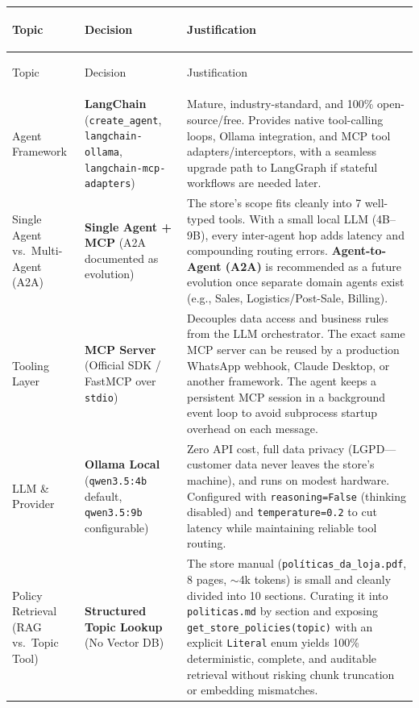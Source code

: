 \documentclass[11pt,a4paper]{article}
\begin{document}
\begingroup
\footnotesize
\setlength{\tabcolsep}{4pt}
\begin{longtable}{>{\bfseries\raggedright\arraybackslash}p{2.9cm} >{\raggedright\arraybackslash}p{3.6cm} >{\raggedright\arraybackslash}p{9.1cm}}
\toprule
Topic & Decision & Justification \\
\midrule
\endfirsthead
\toprule
Topic & Decision & Justification \\
\midrule
\endhead
Agent Framework & \textbf{LangChain} (\texttt{create\_agent}, \texttt{langchain-ollama}, \texttt{langchain-\allowbreak mcp-\allowbreak adapters}) & Mature, industry-standard, and 100\% open-source/free. Provides native tool-calling loops, Ollama integration, and MCP tool adapters/interceptors, with a seamless upgrade path to LangGraph if stateful workflows are needed later. \\
\addlinespace
Single Agent vs.\ Multi-Agent (A2A) & \textbf{Single Agent + MCP} (A2A documented as evolution) & The store's scope fits cleanly into 7 well-typed tools. With a small local LLM (4B--9B), every inter-agent hop adds latency and compounding routing errors. \textbf{Agent-to-Agent (A2A)} is recommended as a future evolution once separate domain agents exist (e.g., Sales, Logistics/Post-Sale, Billing). \\
\addlinespace
Tooling Layer & \textbf{MCP Server} (Official SDK / FastMCP over \texttt{stdio}) & Decouples data access and business rules from the LLM orchestrator. The exact same MCP server can be reused by a production WhatsApp webhook, Claude Desktop, or another framework. The agent keeps a persistent MCP session in a background event loop to avoid subprocess startup overhead on each message. \\
\addlinespace
LLM \& Provider & \textbf{Ollama Local} (\texttt{qwen3.5:4b} default, \texttt{qwen3.5:9b} configurable) & Zero API cost, full data privacy (LGPD---customer data never leaves the store's machine), and runs on modest hardware. Configured with \texttt{reasoning=False} (thinking disabled) and \texttt{temperature=0.2} to cut latency while maintaining reliable tool routing. \\
\addlinespace
Policy Retrieval (RAG vs.\ Topic Tool) & \textbf{Structured Topic Lookup} (No Vector DB) & The store manual (\texttt{pol\'iticas\_da\_loja.pdf}, 8 pages, $\sim$4k tokens) is small and cleanly divided into 10 sections. Curating it into \texttt{politicas.md} by section and exposing \texttt{get\_store\_policies(topic)} with an explicit \texttt{Literal} enum yields 100\% deterministic, complete, and auditable retrieval without risking chunk truncation or embedding mismatches. \\

\end{longtable}
\end{document}
